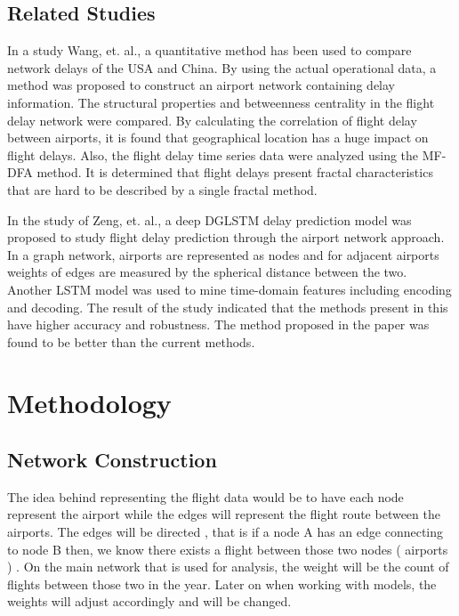 \documentclass[sigconf,nonacm]{acmart}
\begin{document}
\subsection{Related Studies}
In a study Wang, et. al.\cite{Wang2020}, a quantitative method has been used to compare network delays of the USA and China. By using the actual operational data, a method was proposed to construct an airport network containing delay information. The structural properties and betweenness centrality in the flight delay network were compared. By calculating the correlation of flight delay between airports, it is found that geographical location has a huge impact on flight delays. Also, the flight delay time series data were analyzed using the MF-DFA method. It is determined that flight delays present fractal characteristics that are hard to be described by a single fractal method. 


In the study of Zeng, et. al.\cite{Zeng2021}, a deep DGLSTM delay prediction model was proposed to study flight delay prediction through the airport network approach. In a graph network, airports are represented as nodes and for adjacent airports weights of edges are measured by the spherical distance between the two. Another LSTM model was used to mine time-domain features including encoding and decoding. The result of the study indicated that the methods present in this have higher accuracy and robustness. The method proposed in the paper was found to be better than the current methods. 


\section{Methodology}
\subsection{Network Construction}
The idea behind representing the flight data would be to have each node represent the airport while the edges will represent the flight route between the airports. The edges will be directed , that is if a node A has an edge connecting to node B then, we know there exists a flight between those two nodes ( airports ) . On the main network that is used for analysis, the weight will be the count of flights between those two in the year. Later on when working with models, the weights will adjust accordingly and will be changed. 
\end{document}
